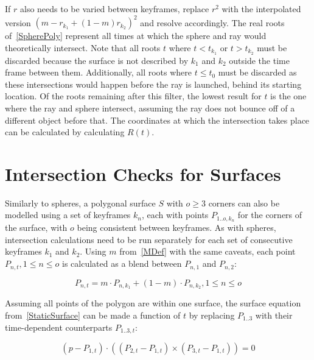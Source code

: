If \(r\) also needs to be varied between keyframes,
replace \(r^2\) with the interpolated version \({(m - r_{k_1} + (1-m) r_{k_2})}^2\) and resolve accordingly.
\newline
The real roots of~\eqref{SpherePoly} represent all times at which the sphere and ray would theoretically intersect.
Note that all roots \(t\) where \(t < t_{k_1}\) or \(t > t_{k_2}\) must be discarded
because the surface is not described by \(k_1\) and \(k_2\) outside the time frame between them.
Additionally, all roots where \(t \le t_0\) must be discarded as these intersections would happen before the ray is launched,
behind its starting location.
\newline
Of the roots remaining after this filter, the lowest result for \(t\) is the one where the ray and sphere intersect,
assuming the ray does not bounce off of a different object before that.
The coordinates at which the intersection takes place can be calculated by calculating \(R(t)\).

\section{Intersection Checks for Surfaces}\label{sec:IntersectSurface}

Similarly to spheres, a polygonal surface \(S\) with \(o \ge 3\) corners can also be modelled using a set of keyframes \(k_n\),
each with points \(P_{1..o, k_n}\) for the corners of the surface, with \(o\) being consistent between keyframes.
As with spheres, intersection calculations need to be run separately for each set of consecutive keyframes \(k_1\) and \(k_2\).
\newline
Using \(m\) from~\eqref{MDef} with the same caveats,
each point \(P_{n, t}, 1 \le n \le o\) is calculated as a blend between \(P_{n, 1}\) and \(P_{n, 2}\):

\begin{equation}\label{SurfacePointDef}
    P_{n, t} = m \cdot P_{n, k_1} + (1 - m) \cdot P_{n, k_2}, 1 \le n \le o
\end{equation}

Assuming all points of the polygon are within one surface,
the surface equation from~\eqref{StaticSurface} can be made a function of \(t\)
by replacing \(P_{1..3}\) with their time-dependent counterparts \(P_{1..3, t}\):

\begin{equation}\label{SurfaceDef}
    (p - P_{1, t}) \cdot ((P_{2, t} - P_{1, t}) \times (P_{3, t} - P_{1, t})) = 0
\end{equation}

